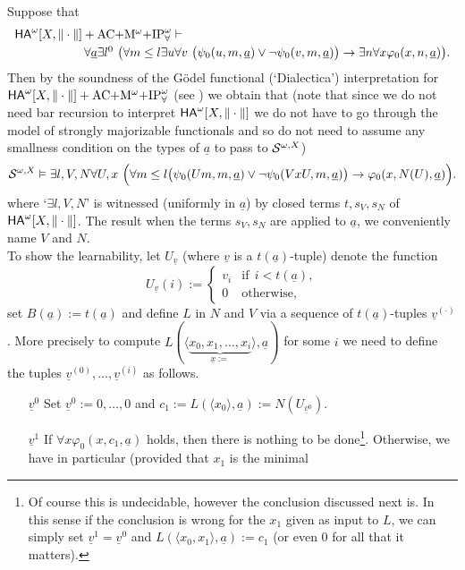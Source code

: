 \documentclass[1p]{elsarticle}
\newcommand{\usftext}[1]{\textsf{\upshape #1}}
\newcommand{\ba}{\begin{array}} \newcommand{\ea}{\end{array}}
\newcommand{\ha}{\ensuremath{{\usftext{HA}}^\omega}} %
\renewcommand{\models}{\vDash}  %
\newcommand{\tup}{\underline} %
\newcommand{\Tif}{\text{if}\ }
\newcommand{\Telse}{\text{otherwise}}
\theoremstyle{plain}
\theoremstyle{definition}
\theoremstyle{remark}
\renewenvironment{proof}[1][]{\noindent{\bf Proof{#1}. }}{\nopagebreak[4]{\hspace*{\fill}
  $\Box$              %
 }{\vspace{2ex}}}
\renewcommand{\phi}{\varphi}
\theoremstyle{definition}
\begin{document}
{\begin{proof}
Suppose that 
\[ \ba{l} 
\ha[X,\|\cdot\|]+\mbox{AC$+$M$^{\omega}+$IP}^{\omega}_{\forall} 
\vdash \\[1mm] \hspace*{2cm} 
\forall \underline{a}\exists l^0\ \big( 
\forall m\leq l \exists u \forall v\ \big(\psi_0(u,m,\tup a) \vee \neg\psi_0(v,m,\tup a)\big)\rightarrow \exists n \forall x \phi_0(x,n,\tup a)\big).
\ea \]
Then by the soundness of the G\"odel functional (`Dialectica') 
interpretation for $\ha[X,\|\cdot\|]+\mbox{AC$+$M$^{\omega}+$IP}^{\omega}_{\forall}$ (see \cite{Kohlenbach(book)}) we obtain that (note that since we do not need 
bar recursion to interpret $\ha[X,\|\cdot\|]$ we do not have to go through 
the model of strongly majorizable functionals and so do not need to assume 
any smallness condition on the types of $\underline{a}$ to pass to 
${\cal S}^{\omega,X}$)   
\[ {\cal S}^{\omega,X} \models \exists l,V,N \forall U,x\ \Big(\forall m\leq l 
\big (\psi_0(Um,m,\tup a) \vee \neg\psi_0(VxU,m,\tup a)\big)
\rightarrow \phi_0(x,N(U),\tup a)\Big).
\]
where `$\exists l,V,N$' is witnessed (uniformly in $\underline{a}$) 
by closed terms $t,s_V,s_N$ of 
$\ha[X,\|\cdot\|]$. 
The result when the terms $s_V,s_N$ are applied to 
$\tup a$, we conveniently name $V$ and $N$.\\
To show the learnability, let $U_{\tup v}$ (where $\tup v$ is a $t(\tup a)$-tuple) denote the function \[
U_{\tup v}(i):=\begin{cases}
v_i&\Tif\ i<t(\tup a),\\
0&\Telse,
\end{cases}\] set $B(\tup a):=t(\tup a)$ and define $L$ in $N$ and $V$ via a sequence of $t(\tup a)$-tuples $\tup v^{(\cdot)}$.
More precisely to compute $L(\langle \underbrace {x_0,x_1,\ldots,x_i}_{\tup x:=}\rangle,\tup a)$ for some $i$ we need to
define the tuples $\tup v^{(0)},\ldots,\tup v^{(i)}$ as follows.
\begin{enumerate}
\item[$\tup v^0$] 
Set $\tup v^0:=0,\ldots,0$ and $c_1:=L(\langle x_0\rangle,\tup a):=
N(U_{\tup v^0})$.
\item[$\tup v^1$] If $\forall x \phi_0(x,c_1,\tup a)$ holds, then there is nothing to be 
done\footnote{
Of course this is undecidable, however the conclusion discussed next is. In this sense if the conclusion is wrong for the $x_1$ given as input to $L$, 
we can simply set $\tup v^1=\tup v^0$ and $L(\langle x_0,x_1\rangle,\tup a):=c_1$ (or even $0$ for all that it matters).
}. 
Otherwise, we have in particular (provided that $x_1$ is the minimal 

\end{enumerate}
\end{proof}}
\end{document}
